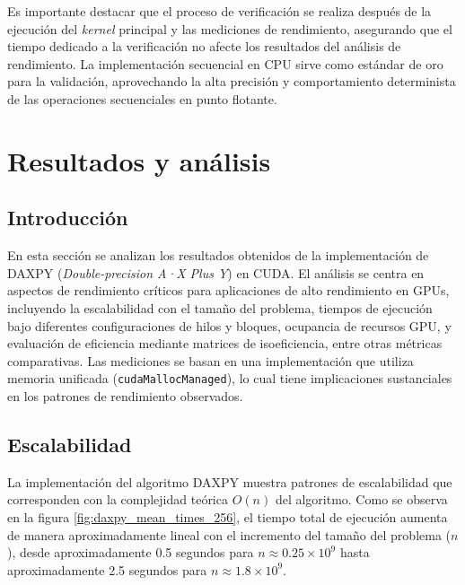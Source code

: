             Es importante destacar que el proceso de verificación se realiza después de la ejecución del \textit{kernel} principal y las mediciones de rendimiento, asegurando que el tiempo dedicado a la verificación no afecte los resultados del análisis de rendimiento. La implementación secuencial en CPU sirve como estándar de oro para la validación, aprovechando la alta precisión y comportamiento determinista de las operaciones secuenciales en punto flotante.

\newpage

\section{Resultados y análisis}
    
    \subsection{Introducción}
    
        En esta sección se analizan los resultados obtenidos de la implementación de DAXPY (\textit{Double-precision A·X Plus Y}) en CUDA. El análisis se centra en aspectos de rendimiento críticos para aplicaciones de alto rendimiento en GPUs, incluyendo la escalabilidad con el tamaño del problema, tiempos de ejecución bajo diferentes configuraciones de hilos y bloques, ocupancia de recursos GPU, y evaluación de eficiencia mediante matrices de isoeficiencia, entre otras métricas comparativas. Las mediciones se basan en una implementación que utiliza memoria unificada (\texttt{cudaMallocManaged}), lo cual tiene implicaciones sustanciales en los patrones de rendimiento observados.
    
    \subsection{Escalabilidad}
    
        La implementación del algoritmo DAXPY muestra patrones de escalabilidad que corresponden con la complejidad teórica $O(n)$ del algoritmo. Como se observa en la figura \ref{fig:daxpy_mean_times_256}, el tiempo total de ejecución aumenta de manera aproximadamente lineal con el incremento del tamaño del problema ($n$), desde aproximadamente 0.5 segundos para $n \approx 0.25 \times 10^9$ hasta aproximadamente 2.5 segundos para $n \approx 1.8 \times 10^9$.

